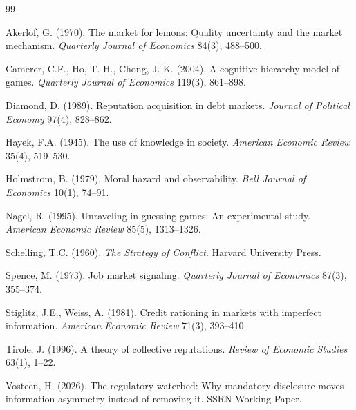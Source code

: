 \documentclass[11pt]{article}
\begin{document}
\begin{thebibliography}{99}

 Akerlof, G. (1970). The market for lemons: Quality uncertainty and the market mechanism. \textit{Quarterly Journal of Economics} 84(3), 488--500.

 Camerer, C.F., Ho, T.-H., Chong, J.-K. (2004). A cognitive hierarchy model of games. \textit{Quarterly Journal of Economics} 119(3), 861--898.

 Diamond, D. (1989). Reputation acquisition in debt markets. \textit{Journal of Political Economy} 97(4), 828--862.

 Hayek, F.A. (1945). The use of knowledge in society. \textit{American Economic Review} 35(4), 519--530.

 Holmstrom, B. (1979). Moral hazard and observability. \textit{Bell Journal of Economics} 10(1), 74--91.

 Nagel, R. (1995). Unraveling in guessing games: An experimental study. \textit{American Economic Review} 85(5), 1313--1326.

 Schelling, T.C. (1960). \textit{The Strategy of Conflict}. Harvard University Press.

 Spence, M. (1973). Job market signaling. \textit{Quarterly Journal of Economics} 87(3), 355--374.

 Stiglitz, J.E., Weiss, A. (1981). Credit rationing in markets with imperfect information. \textit{American Economic Review} 71(3), 393--410.

 Tirole, J. (1996). A theory of collective reputations. \textit{Review of Economic Studies} 63(1), 1--22.

 Vosteen, H. (2026). The regulatory waterbed: Why mandatory disclosure moves information asymmetry instead of removing it. SSRN Working Paper.

\end{thebibliography}
\end{document}

